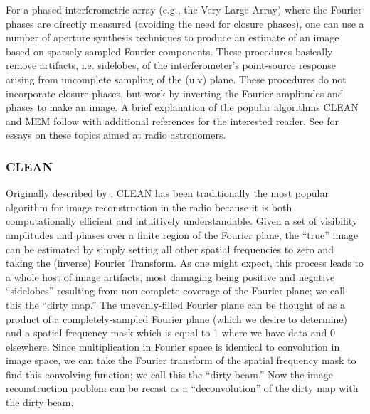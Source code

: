 \documentclass[12pt]{article}
\begin{document}
For a phased interferometric array (e.g., the Very Large Array) where
the Fourier phases are directly measured (avoiding the need for
closure phases), one can use a number of aperture synthesis techniques
to produce an estimate of an image based on sparsely sampled Fourier
components.  These procedures basically remove artifacts, i.e.
sidelobes, of the interferometer's point-source response arising from
uncomplete sampling of the (u,v) plane.  These procedures do not
incorporate closure phases, but work by inverting the Fourier
amplitudes and phases to make an image.  A brief explanation of the
popular algorithms CLEAN and MEM follow with additional
references for the interested reader.  See \cite{nrao86} for essays on
these topics aimed at radio astronomers.

\subsubsection{CLEAN}
Originally described by \cite{hogbom74}, CLEAN has been traditionally
the most popular algorithm for image reconstruction in the radio
because it is both computationally efficient and intuitively
understandable.  Given a set of visibility amplitudes and phases over
a finite region of the Fourier plane, the ``true'' image can be
estimated by simply setting all other spatial frequencies to zero and
taking the (inverse) Fourier Transform.  As one might expect, this
process leads to a whole host of image artifacts, most damaging being
positive and negative ``sidelobes'' resulting from non-complete
coverage of the Fourier plane; we call this the ``dirty map.''  The
unevenly-filled Fourier plane can be thought of as a product of a
completely-sampled Fourier plane (which we desire to determine) and a
spatial frequency mask which is equal to 1 where we have data and 0
elsewhere.  Since multiplication in Fourier space is identical to
convolution in image space, we can take the Fourier transform of the
spatial frequency mask to find this convolving function; we call this
the ``dirty beam.''  Now the image reconstruction problem can be
recast as a ``deconvolution'' of the dirty map with the dirty beam.
\end{document}
